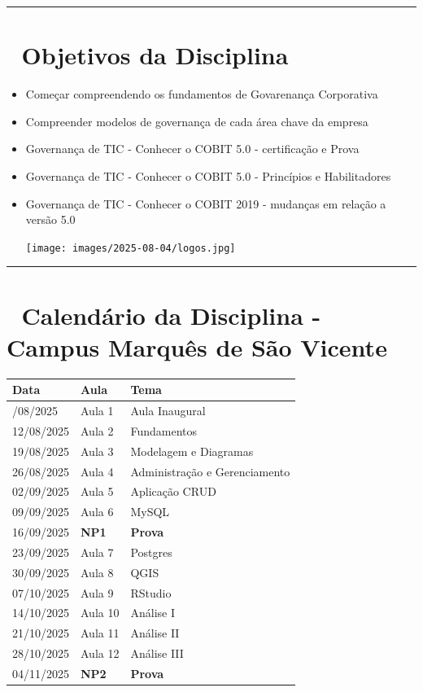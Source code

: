 \documentclass[
]{book}
\begin{document}
\begin{center}\rule{0.5\linewidth}{0.5pt}\end{center}

\chapter{🎯 Objetivos da Disciplina}\label{objetivos-da-disciplina}

\begin{itemize}
\item
  Começar compreendendo os fundamentos de Govarenança Corporativa
\item
  Compreender modelos de governança de cada área chave da empresa
\item
  Governança de TIC - Conhecer o COBIT 5.0 - certificação e Prova
\item
  Governança de TIC - Conhecer o COBIT 5.0 - Princípios e Habilitadores
\item
  Governança de TIC - Conhecer o COBIT 2019 - mudanças em relação a versão 5.0

  \texttt{[image: images/2025-08-04/logos.jpg]}
\end{itemize}

\begin{center}\rule{0.5\linewidth}{0.5pt}\end{center}

\chapter{📅 Calendário da Disciplina - Campus Marquês de São Vicente}\label{calenduxe1rio-da-disciplina---campus-marquuxeas-de-suxe3o-vicente}

\begin{longtable}[]{@{}lll@{}}
\toprule\noalign{}
Data & Aula & Tema \\
\midrule\noalign{}
\endhead
\bottomrule\noalign{}
\endlastfoot
05/08/2025 & Aula 1 & Aula Inaugural \\
12/08/2025 & Aula 2 & Fundamentos \\
19/08/2025 & Aula 3 & Modelagem e Diagramas \\
26/08/2025 & Aula 4 & Administração e Gerenciamento \\
02/09/2025 & Aula 5 & Aplicação CRUD \\
09/09/2025 & Aula 6 & MySQL \\
16/09/2025 & \textbf{NP1} & \textbf{Prova} \\
23/09/2025 & Aula 7 & Postgres \\
30/09/2025 & Aula 8 & QGIS \\
07/10/2025 & Aula 9 & RStudio \\
14/10/2025 & Aula 10 & Análise I \\
21/10/2025 & Aula 11 & Análise II \\
28/10/2025 & Aula 12 & Análise III \\
04/11/2025 & \textbf{NP2} & \textbf{Prova} \\
\end{longtable}
\end{document}
